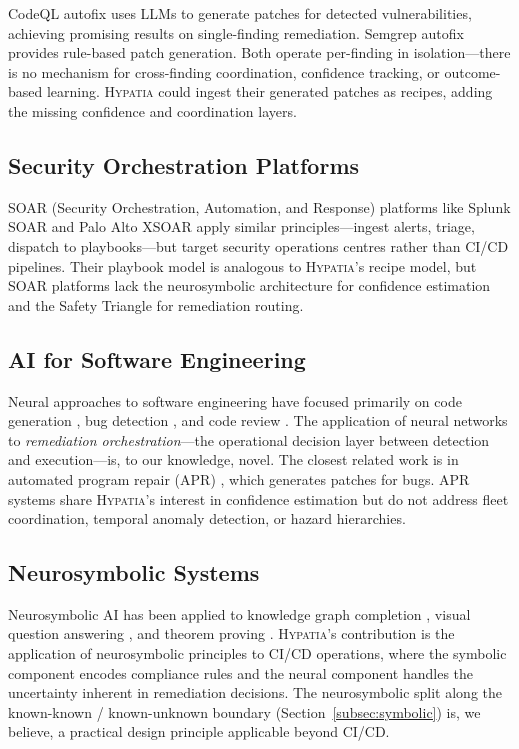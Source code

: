 \documentclass[11pt,a4paper]{article}
\begin{document}
CodeQL autofix \citep{codeql-autofix2024} uses LLMs to generate patches for detected vulnerabilities, achieving promising results on single-finding remediation. Semgrep autofix provides rule-based patch generation. Both operate per-finding in isolation---there is no mechanism for cross-finding coordination, confidence tracking, or outcome-based learning. \textsc{Hypatia} could ingest their generated patches as recipes, adding the missing confidence and coordination layers.

\subsection{Security Orchestration Platforms}

SOAR (Security Orchestration, Automation, and Response) platforms like Splunk SOAR and Palo Alto XSOAR \citep{soar2020} apply similar principles---ingest alerts, triage, dispatch to playbooks---but target security operations centres rather than CI/CD pipelines. Their playbook model is analogous to \textsc{Hypatia}'s recipe model, but SOAR platforms lack the neurosymbolic architecture for confidence estimation and the Safety Triangle for remediation routing.

\subsection{AI for Software Engineering}

Neural approaches to software engineering have focused primarily on code generation \citep{chen2021codex}, bug detection \citep{li2018}, and code review \citep{tufano2022}. The application of neural networks to \emph{remediation orchestration}---the operational decision layer between detection and execution---is, to our knowledge, novel. The closest related work is in automated program repair (APR) \citep{goues2019}, which generates patches for bugs. APR systems share \textsc{Hypatia}'s interest in confidence estimation but do not address fleet coordination, temporal anomaly detection, or hazard hierarchies.

\subsection{Neurosymbolic Systems}

Neurosymbolic AI has been applied to knowledge graph completion \citep{garcez2019}, visual question answering \citep{yi2018}, and theorem proving \citep{bansal2019}. \textsc{Hypatia}'s contribution is the application of neurosymbolic principles to CI/CD operations, where the symbolic component encodes compliance rules and the neural component handles the uncertainty inherent in remediation decisions. The neurosymbolic split along the known-known / known-unknown boundary (Section~\ref{subsec:symbolic}) is, we believe, a practical design principle applicable beyond CI/CD.
\end{document}
